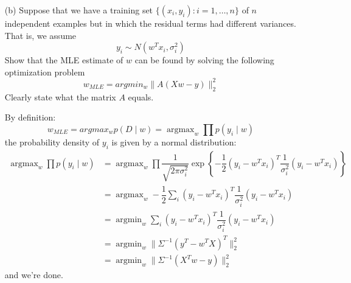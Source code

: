 \documentclass{article}
\begin{document}
\begin{itemize}
        \item [(b)] Suppose that we have a training set $\{(x_{i}, y_{i}) : i = 1, \ldots, n\}$ of $n$ independent examples but in which the residual terms had different variances. That is, we assume
            \begin{equation*}
                y_{i} \sim N(w^{T}x_{i}, \sigma^{2}_{i})
            \end{equation*}
        Show that the MLE estimate of $w$ can be found by solving the following optimization problem
            \begin{equation*}
                w_{MLE} = argmin_{w} \lVert A(Xw - y) \rVert^{2}_{2}
            \end{equation*}
        Clearly state what the matrix $A$ equals.
            \begin{answer}
                By definition:
                    \begin{equation*}
                        w_{MLE} = argmax_{w} p(D \mid w) = \mathop{argmax}_{w} \prod p(y_{i} \mid w)
                    \end{equation*}
                the probability density of $y_{i}$ is given by a normal distribution:
                    \begin{align*}
                        \mathop{argmax}_{w} \prod p(y_{i} \mid w) &= \mathop{argmax}_{w} \prod \dfrac{1}{\sqrt{2\pi\sigma_{i}^{2}}}\exp\left\{-\dfrac{1}{2}(y_{i} - w^{T}x_{i})^{T}\dfrac{1}{\sigma_{i}^{2}}(y_{i} - w^{T}x_{i})\right\} \\
                                                                  &= \mathop{argmax}_{w} -\dfrac{1}{2}\sum_{i}(y_{i} - w^{T}x_{i})^{T}\dfrac{1}{\sigma_{i}^{2}}(y_{i} - w^{T}x_{i})                                                      \\
                                                                  &= \mathop{argmin}_{w} \sum_{i} (y_{i} - w^{T}x_{i})^{T}\dfrac{1}{\sigma_{i}^{2}}(y_{i} - w^{T}x_{i})                                                                  \\
                                                                  &= \mathop{argmin}_{w} \lVert \Sigma^{-1}(y^{T} - w^{T}X)^{T} \rVert_{2}^{2}                                                                                           \\
                                                                  &= \mathop{argmin}_{w} \lVert \Sigma^{-1}(X^{T}w - y) \rVert^{2}_{2}                                                                                                     
                    \end{align*}
                and we're done.
            \end{answer}


\end{itemize}
\end{document}
